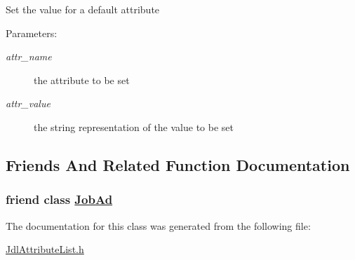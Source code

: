 Set the value for a default attribute \begin{Desc}
\item[Parameters:]
\begin{description}
\item[{\em attr\_\-name}]the attribute to be set \item[{\em attr\_\-value}]the string representation of the value to be set \end{description}
\end{Desc}


\subsection{Friends And Related Function Documentation}
\hypertarget{classglite_1_1wms_1_1jdl_1_1JdlAttributeList_z25_17}{
\subsubsection[JobAd]{\setlength{\rightskip}{0pt plus 5cm}friend class \hyperlink{classglite_1_1wms_1_1jdl_1_1JobAd}{Job\-Ad}}}
\label{classglite_1_1wms_1_1jdl_1_1JdlAttributeList_z25_17}




The documentation for this class was generated from the following file:\begin{CompactItemize}
\item 
\hyperlink{JdlAttributeList_8h}{Jdl\-Attribute\-List.h}\end{CompactItemize}
